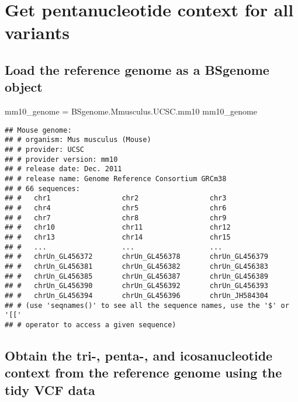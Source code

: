 \documentclass[]{article}
\newenvironment{Shaded}{\begin{snugshade}}{\end{snugshade}}
\newcommand{\NormalTok}[1]{#1}
\newcommand{\StringTok}[1]{\textcolor[rgb]{0.31,0.60,0.02}{#1}}
\begin{document}
\hypertarget{get-pentanucleotide-context-for-all-variants}{%
\section{Get pentanucleotide context for all
variants}\label{get-pentanucleotide-context-for-all-variants}}

\hypertarget{load-the-reference-genome-as-a-bsgenome-object}{%
\subsection{Load the reference genome as a BSgenome
object}\label{load-the-reference-genome-as-a-bsgenome-object}}

\begin{Shaded}
\begin{Highlighting}[]
\NormalTok{mm10_genome =}\StringTok{ }\NormalTok{BSgenome.Mmusculus.UCSC.mm10}
\NormalTok{mm10_genome}
\end{Highlighting}
\end{Shaded}

\begin{verbatim}
## Mouse genome:
## # organism: Mus musculus (Mouse)
## # provider: UCSC
## # provider version: mm10
## # release date: Dec. 2011
## # release name: Genome Reference Consortium GRCm38
## # 66 sequences:
## #   chr1                 chr2                 chr3                
## #   chr4                 chr5                 chr6                
## #   chr7                 chr8                 chr9                
## #   chr10                chr11                chr12               
## #   chr13                chr14                chr15               
## #   ...                  ...                  ...                 
## #   chrUn_GL456372       chrUn_GL456378       chrUn_GL456379      
## #   chrUn_GL456381       chrUn_GL456382       chrUn_GL456383      
## #   chrUn_GL456385       chrUn_GL456387       chrUn_GL456389      
## #   chrUn_GL456390       chrUn_GL456392       chrUn_GL456393      
## #   chrUn_GL456394       chrUn_GL456396       chrUn_JH584304      
## # (use 'seqnames()' to see all the sequence names, use the '$' or '[['
## # operator to access a given sequence)
\end{verbatim}

\hypertarget{obtain-the-tri--penta--and-icosanucleotide-context-from-the-reference-genome-using-the-tidy-vcf-data}{%
\subsection{Obtain the tri-, penta-, and icosanucleotide context from
the reference genome using the tidy VCF
data}\label{obtain-the-tri--penta--and-icosanucleotide-context-from-the-reference-genome-using-the-tidy-vcf-data}}
\end{document}
